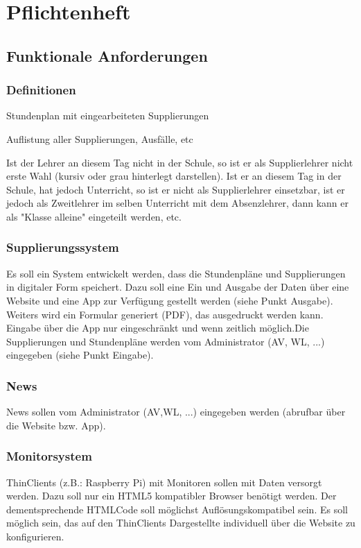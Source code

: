 \chapter{Pflichtenheft}

\section{Funktionale Anforderungen}

\subsection{Definitionen}
\begin{description}[style=nextline]
	\item[angepasster Stundenplan]
		Stundenplan mit eingearbeiteten Supplierungen 
	\item[tabellarischer Supplierplan]
		Auflistung aller Supplierungen, Ausfälle, etc
	\item[Relevanz bei Ersatzlehrern]
		Ist der Lehrer an diesem Tag nicht in der Schule, so ist er als Supplierlehrer nicht erste Wahl (kursiv oder grau hinterlegt darstellen). Ist er an diesem Tag in der Schule, hat jedoch Unterricht, so ist er nicht als Supplierlehrer einsetzbar, ist er jedoch als Zweitlehrer im selben Unterricht mit dem Absenzlehrer, dann kann er als "Klasse alleine" eingeteilt werden, etc.
\end{description}

\subsection{Supplierungssystem}
Es soll ein System entwickelt werden, dass die Stundenpläne und Supplierungen in digitaler Form speichert. Dazu soll eine Ein­ und Ausgabe der Daten über eine Website und eine App zur Verfügung gestellt werden (siehe Punkt Ausgabe). Weiters wird ein Formular generiert (PDF), das ausgedruckt werden kann.\\
Eingabe über die App nur eingeschränkt und wenn zeitlich möglich.Die Supplierungen und Stundenpläne werden vom Administrator (AV, WL, ...) eingegeben (siehe Punkt Eingabe).

\subsection{News}
News sollen vom Administrator (AV,WL, ...) eingegeben werden (abrufbar über die Website bzw. App).

\subsection{Monitorsystem}
Thin­Clients (z.B.: Raspberry Pi) mit Monitoren sollen mit Daten versorgt werden. Dazu soll nur ein HTML5 kompatibler Browser benötigt werden. Der dementsprechende HTML­Code soll möglichst Auflösungskompatibel sein.
Es soll möglich sein, das auf den Thin­Clients Dargestellte individuell über die Website zu 
konfigurieren.\\

